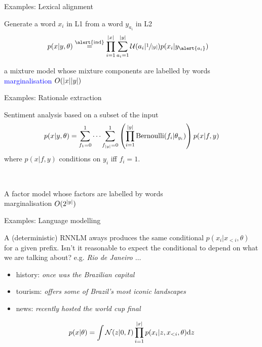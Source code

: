 \begin{frame}{Examples: Lexical alignment}

Generate a word $x_i$ in L1 from a word $y_{a_i}$ in L2 \pause
	\begin{equation*}
	\begin{aligned}
		p(x|y, \theta) %
		&\overset{\text{\alert{ind}}}{=} \prod_{i=1}^{\abs{x}} \sum_{a_i=1}^{\abs{y}}\mathcal U(a_i|\sfrac{1}{\abs{y}})p(x_i|y_{\alert{a_i}}) 
		\end{aligned}
	\end{equation*}

\pause

a mixture model whose mixture components are labelled by words \hfill \textcolor{blue}{marginalisation $O(\abs{x}\abs{y})$}

\end{frame}

\begin{frame}{Examples: Rationale extraction}

Sentiment analysis based on a subset of the input \pause
\begin{equation*}
	\begin{aligned}
		p(x|y, \theta) &= \sum_{f_1=0}^{1}\cdots \sum_{f_{\abs{y}}=0}^{1} \left( \prod_{i=1}^{\abs{y}} \operatorname{Bernoulli}(f_i|\theta_{y_i}) \right) p(x|f,y)  \\
		\end{aligned}
	\end{equation*}
where $p(x|f,y)$ conditions on $y_i$ iff $f_i = 1$.

~ \pause

A factor model whose factors are labelled by words \\
\hfill \alert{marginalisation $O(2^{\abs{y}})$}

\end{frame}

\begin{frame}{Examples: Language modelling}

	A (deterministic) RNNLM aways produces the same conditional $p(x_i|x_{<i}, \theta)$ for a given prefix. \pause Isn't it reasonable to expect the conditional to depend on what we are talking about? \pause e.g. \emph{\alert{Rio de Janeiro $\ldots$}}
	\begin{itemize}
		\item history: \emph{\alert{once was the Brazilian capital}}
		\item tourism: \emph{\alert{offers some of Brazil's most iconic landscapes}}
		\item news: \emph{\alert{recently hosted the world cup final}}
	\end{itemize} \pause
	\vspace{-5pt}
	\begin{equation*}
		p(x|\theta) = \int \mathcal N(z|0, I) \prod_{i=1}^{\abs{x}} p(x_i|z, x_{<i}, \theta) \dd z
	\end{equation*}

\end{frame}


